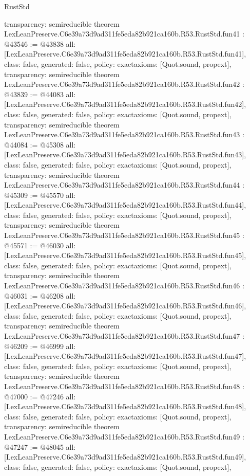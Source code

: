 \begin{lexlean}{RustStd}
\begin{coremodule}
{  transparency: semireducible
}
theorem LexLeanPreserve.C6e39a73d9ad311fe5eda82b921ca160b.R53.RustStd.fun41 : @43546 := @43838 {
  all: [LexLeanPreserve.C6e39a73d9ad311fe5eda82b921ca160b.R53.RustStd.fun41],
  class: false,
  generated: false,
  policy: exact{axioms: [Quot.sound, propext]},
  transparency: semireducible
}
theorem LexLeanPreserve.C6e39a73d9ad311fe5eda82b921ca160b.R53.RustStd.fun42 : @43839 := @44083 {
  all: [LexLeanPreserve.C6e39a73d9ad311fe5eda82b921ca160b.R53.RustStd.fun42],
  class: false,
  generated: false,
  policy: exact{axioms: [Quot.sound, propext]},
  transparency: semireducible
}
theorem LexLeanPreserve.C6e39a73d9ad311fe5eda82b921ca160b.R53.RustStd.fun43 : @44084 := @45308 {
  all: [LexLeanPreserve.C6e39a73d9ad311fe5eda82b921ca160b.R53.RustStd.fun43],
  class: false,
  generated: false,
  policy: exact{axioms: [Quot.sound, propext]},
  transparency: semireducible
}
theorem LexLeanPreserve.C6e39a73d9ad311fe5eda82b921ca160b.R53.RustStd.fun44 : @45309 := @45570 {
  all: [LexLeanPreserve.C6e39a73d9ad311fe5eda82b921ca160b.R53.RustStd.fun44],
  class: false,
  generated: false,
  policy: exact{axioms: [Quot.sound, propext]},
  transparency: semireducible
}
theorem LexLeanPreserve.C6e39a73d9ad311fe5eda82b921ca160b.R53.RustStd.fun45 : @45571 := @46030 {
  all: [LexLeanPreserve.C6e39a73d9ad311fe5eda82b921ca160b.R53.RustStd.fun45],
  class: false,
  generated: false,
  policy: exact{axioms: [Quot.sound, propext]},
  transparency: semireducible
}
theorem LexLeanPreserve.C6e39a73d9ad311fe5eda82b921ca160b.R53.RustStd.fun46 : @46031 := @46208 {
  all: [LexLeanPreserve.C6e39a73d9ad311fe5eda82b921ca160b.R53.RustStd.fun46],
  class: false,
  generated: false,
  policy: exact{axioms: [Quot.sound, propext]},
  transparency: semireducible
}
theorem LexLeanPreserve.C6e39a73d9ad311fe5eda82b921ca160b.R53.RustStd.fun47 : @46209 := @46999 {
  all: [LexLeanPreserve.C6e39a73d9ad311fe5eda82b921ca160b.R53.RustStd.fun47],
  class: false,
  generated: false,
  policy: exact{axioms: [Quot.sound, propext]},
  transparency: semireducible
}
theorem LexLeanPreserve.C6e39a73d9ad311fe5eda82b921ca160b.R53.RustStd.fun48 : @47000 := @47246 {
  all: [LexLeanPreserve.C6e39a73d9ad311fe5eda82b921ca160b.R53.RustStd.fun48],
  class: false,
  generated: false,
  policy: exact{axioms: [Quot.sound, propext]},
  transparency: semireducible
}
theorem LexLeanPreserve.C6e39a73d9ad311fe5eda82b921ca160b.R53.RustStd.fun49 : @47247 := @48045 {
  all: [LexLeanPreserve.C6e39a73d9ad311fe5eda82b921ca160b.R53.RustStd.fun49],
  class: false,
  generated: false,
  policy: exact{axioms: [Quot.sound, propext]},
}
\end{coremodule}
\end{lexlean}
